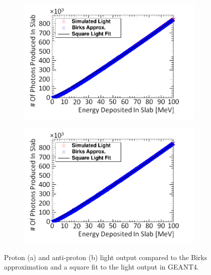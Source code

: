 \begin{figure}[!h]
\centering
\begin{subfigure}{.5\textwidth}
  \centering
  \includegraphics[width=\linewidth]{Chapter4/Figs/Raster/protonSimulatedLightNew.png}
  \captionsetup{width=.9\linewidth}
  \caption{}
  \label{subFig:proton_light}
\end{subfigure}%
\begin{subfigure}{.5\textwidth}
  \centering
  \includegraphics[width=\linewidth]{Chapter4/Figs/Raster/aProtonSimulatedLightNew.png}
  \captionsetup{width=.9\linewidth}
  \caption{}
  \label{subFig:aproton_light}
\end{subfigure}
\caption{Proton (a) and anti-proton (b) light output compared to the Birks approximation and a square fit to the light output in GEANT4.}
\label{fig:proton_aproton_light}
\end{figure}

